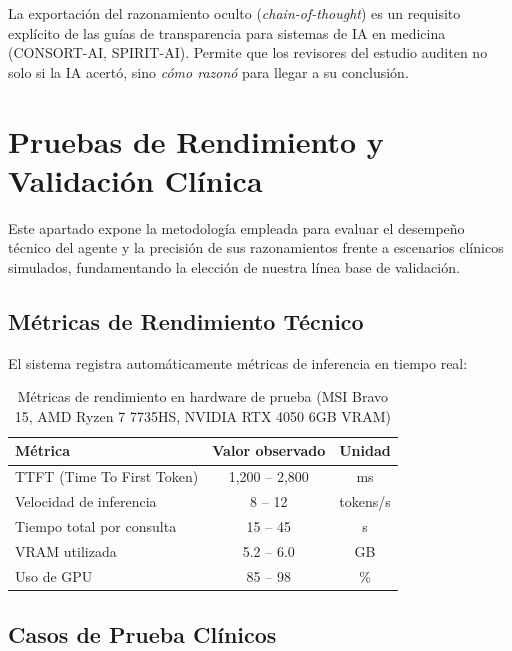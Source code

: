 \documentclass[12pt,a4paper]{article}
\begin{document}
\begin{successbox}
  La exportación del razonamiento oculto (\textit{chain-of-thought}) es un requisito explícito
  de las guías de transparencia para sistemas de IA en medicina (CONSORT-AI, SPIRIT-AI). Permite
  que los revisores del estudio auditen no solo si la IA acertó, sino \textit{cómo razonó} para
  llegar a su conclusión.
\end{successbox}

\newpage

\section{Pruebas de Rendimiento y Validación Clínica}

Este apartado expone la metodología empleada para evaluar el desempeño técnico del agente y la precisión de sus razonamientos frente a escenarios clínicos simulados, fundamentando la elección de nuestra línea base de validación.

\subsection{Métricas de Rendimiento Técnico}

El sistema registra automáticamente métricas de inferencia en tiempo real:

\begin{table}[H]
  \centering
  \caption{Métricas de rendimiento en hardware de prueba (MSI Bravo 15, AMD Ryzen 7 7735HS, NVIDIA RTX 4050 6GB VRAM)}
  \begin{tabular}{lcc}
    \toprule
    \textbf{Métrica} & \textbf{Valor observado} & \textbf{Unidad} \\
    \midrule
    TTFT (Time To First Token) & 1,200 -- 2,800 & ms \\
    Velocidad de inferencia & 8 -- 12 & tokens/s \\
    Tiempo total por consulta & 15 -- 45 & s \\
    VRAM utilizada & 5.2 -- 6.0 & GB \\
    Uso de GPU & 85 -- 98 & \% \\
    \bottomrule
  \end{tabular}
\end{table}

\subsection{Casos de Prueba Clínicos}
\end{document}
